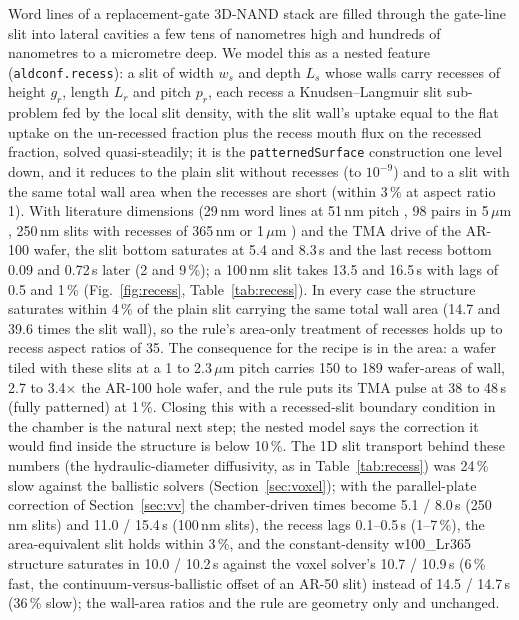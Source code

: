 \documentclass[11pt,letterpaper]{article}
\begin{document}
Word lines of a replacement-gate 3D-NAND stack are filled through the gate-line slit into lateral cavities a few tens of nanometres high and hundreds of nanometres to a micrometre deep. We model this as a nested feature (\texttt{aldconf.recess}): a slit of width $w_s$ and depth $L_s$ whose walls carry recesses of height $g_r$, length $L_r$ and pitch $p_r$, each recess a Knudsen--Langmuir slit sub-problem fed by the local slit density, with the slit wall's uptake equal to the flat uptake on the un-recessed fraction plus the recess mouth flux on the recessed fraction, solved quasi-steadily; it is the \texttt{patternedSurface} construction one level down, and it reduces to the plain slit without recesses (to $10^{-9}$) and to a slit with the same total wall area when the recesses are short (within 3\,\% at aspect ratio 1). With literature dimensions (29\,nm word lines at 51\,nm pitch \cite{lee2022}, 98 pairs in 5\,$\mu$m \cite{reiter2024}, 250\,nm slits with recesses of 365\,nm \cite{techinsights2014} or 1\,$\mu$m \cite{onto2023}) and the TMA drive of the AR-100 wafer, the slit bottom saturates at 5.4 and 8.3\,s and the last recess bottom 0.09 and 0.72\,s later (2 and 9\,\%); a 100\,nm slit takes 13.5 and 16.5\,s with lags of 0.5 and 1\,\% (Fig.~\ref{fig:recess}, Table~\ref{tab:recess}). In every case the structure saturates within 4\,\% of the plain slit carrying the same total wall area (14.7 and 39.6 times the slit wall), so the rule's area-only treatment of recesses holds up to recess aspect ratios of 35. The consequence for the recipe is in the area: a wafer tiled with these slits at a 1 to 2.3\,$\mu$m pitch carries 150 to 189 wafer-areas of wall, 2.7 to 3.4$\times$ the AR-100 hole wafer, and the rule puts its TMA pulse at 38 to 48\,s (fully patterned) at 1\,\%. Closing this with a recessed-slit boundary condition in the chamber is the natural next step; the nested model says the correction it would find inside the structure is below 10\,\%. The 1D slit transport behind these numbers (the hydraulic-diameter diffusivity, as in Table~\ref{tab:recess}) was 24\,\% slow against the ballistic solvers (Section~\ref{sec:voxel}); with the parallel-plate correction of Section~\ref{sec:vv} the chamber-driven times become 5.1 / 8.0\,s (250\,nm slits) and 11.0 / 15.4\,s (100\,nm slits), the recess lags 0.1--0.5\,s (1--7\,\%), the area-equivalent slit holds within 3\,\%, and the constant-density w100\_Lr365 structure saturates in 10.0 / 10.2\,s against the voxel solver's 10.7 / 10.9\,s (6\,\% fast, the continuum-versus-ballistic offset of an AR-50 slit) instead of 14.5 / 14.7\,s (36\,\% slow); the wall-area ratios and the rule are geometry only and unchanged.
\end{document}
